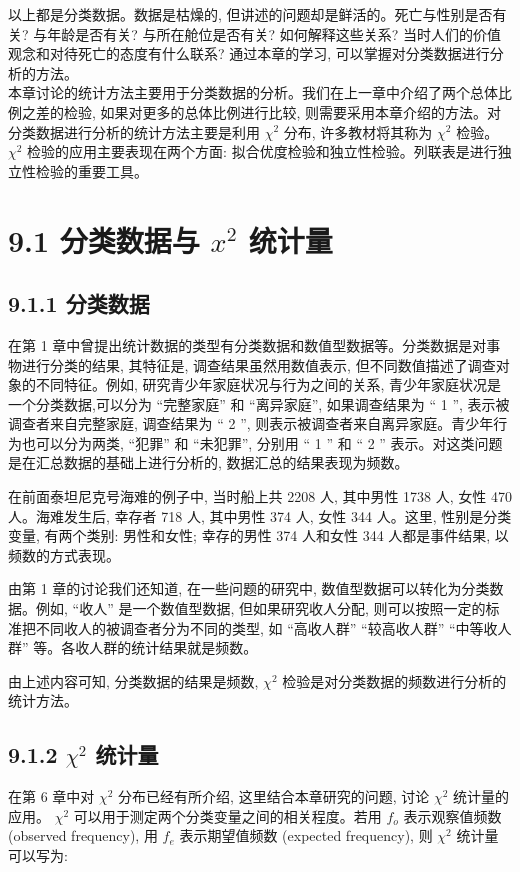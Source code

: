 \documentclass[10pt]{article}
\begin{document}
\begin{CJK*}{UTF8}{bsmi}
以上都是分类数据。数据是枯燥的, 但讲述的问题却是鲜活的。死亡与性别是否有关? 与年龄是否有关? 与所在舱位是否有关? 如何解释这些关系? 当时人们的价值观念和对待死亡的态度有什么联系? 通过本章的学习, 可以掌握对分类数据进行分析的方法。\\
本章讨论的统计方法主要用于分类数据的分析。我们在上一章中介绍了两个总体比例之差的检验, 如果对更多的总体比例进行比较, 则需要采用本章介绍的方法。对分类数据进行分析的统计方法主要是利用 $\chi^{2}$ 分布, 许多教材将其称为 $\chi^{2}$ 检验。 $\chi^{2}$ 检验的应用主要表现在两个方面: 拟合优度检验和独立性检验。列联表是进行独立性检验的重要工具。

\section*{9.1 分类数据与 $x^{2}$ 统计量}
\subsection*{9.1.1 分类数据}
在第 1 章中曾提出统计数据的类型有分类数据和数值型数据等。分类数据是对事物进行分类的结果, 其特征是, 调查结果虽然用数值表示, 但不同数值描述了调查对象的不同特征。例如, 研究青少年家庭状况与行为之间的关系, 青少年家庭状况是一个分类数据,可以分为 “完整家庭” 和 “离异家庭”, 如果调查结果为 “ 1 ”, 表示被调查者来自完整家庭, 调查结果为 “ 2 ”, 则表示被调查者来自离异家庭。青少年行为也可以分为两类, “犯罪” 和 “未犯罪”, 分别用 “ 1 ” 和 “ 2 ” 表示。对这类问题是在汇总数据的基础上进行分析的, 数据汇总的结果表现为频数。

在前面泰坦尼克号海难的例子中, 当时船上共 2208 人, 其中男性 1738 人, 女性 470 人。海难发生后, 幸存者 718 人, 其中男性 374 人, 女性 344 人。这里, 性别是分类变量, 有两个类别: 男性和女性; 幸存的男性 374 人和女性 344 人都是事件结果, 以频数的方式表现。

由第 1 章的讨论我们还知道, 在一些问题的研究中, 数值型数据可以转化为分类数据。例如, “收人” 是一个数值型数据, 但如果研究收人分配, 则可以按照一定的标准把不同收人的被调查者分为不同的类型, 如 “高收人群” “较高收人群” “中等收人群” 等。各收人群的统计结果就是频数。

由上述内容可知, 分类数据的结果是频数, $\chi^{2}$ 检验是对分类数据的频数进行分析的统计方法。

\subsection*{9.1.2 $\chi^{2}$ 统计量}
在第 6 章中对 $\chi^{2}$ 分布已经有所介绍, 这里结合本章研究的问题, 讨论 $\chi^{2}$ 统计量的应用。 $\chi^{2}$ 可以用于测定两个分类变量之间的相关程度。若用 $f_{o}$ 表示观察值频数 (observed frequency), 用 $f_{e}$ 表示期望值频数 (expected frequency), 则 $\chi^{2}$ 统计量可以写为:



\end{CJK*}
\end{document}
